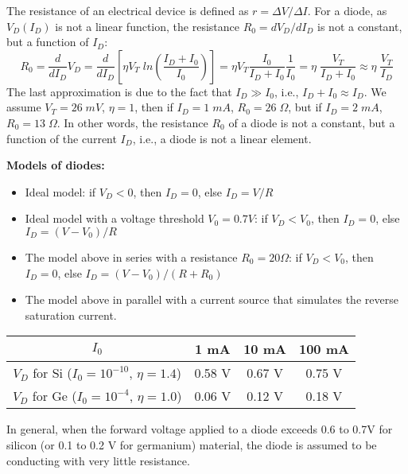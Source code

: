The resistance of an electrical device is defined as $r=\Delta V/\Delta I$.
For a diode, as $V_D(I_D)$ is not a linear function, the resistance 
$R_0=dV_D/dI_D$ is not a constant, but a function of $I_D$:
\[
 R_0=\frac{d}{dI_D}V_D=\frac{d}{dI_D} [\eta V_T\;ln (\frac{I_D+I_0}{I_0})]
=\eta V_T \frac{I_0}{I_D+I_0}\frac{1}{I_0}=\eta \; \frac{V_T}{I_D+I_0}
\approx \eta \; \frac{V_T}{I_D}	\]
The last approximation is due to the fact that $I_D \gg I_0$, i.e., 
$I_D+I_0\approx I_D$. We assume $V_T=26\;mV$, $\eta=1$, then if $I_D=1\;mA$, 
$R_0=26\;\Omega$, but if $I_D=2\;mA$, $R_0=13\;\Omega$. In other words, the 
resistance $R_0$ of a diode is not a constant, but a function of the current 
$I_D$, i.e.,  a diode is not a linear element.

{\bf Models of diodes:}


\begin{itemize}
\item Ideal model: if $V_D<0$, then $I_D=0$, else $I_D=V/R$
\item Ideal model with a voltage threshold $V_0=0.7V$:
	if $V_D<V_0$, then $I_D=0$, else $I_D=(V-V_0)/R$
\item The model above in series with a resistance $R_0=20\Omega$:
	if $V_D<V_0$, then $I_D=0$, else $I_D=(V-V_0)/(R+R_0)$
\item The model above in parallel with a current source that simulates
  the reverse saturation current.
\end{itemize}


\begin{tabular}{c||c|c|c}\\ \hline
 $I_0$	& 1 mA & 10 mA & 100 mA	\\ \hline
$V_D$ for Si ($I_0=10^{-10}$, $\eta=1.4$) & 0.58 V & 0.67 V & 0.75 V \\
$V_D$ for Ge ($I_0=10^{-4}$, $\eta=1.0$) & 0.06 V & 0.12 V & 0.18 V \\
\end{tabular}

In general, when the forward voltage applied to a diode exceeds 0.6 to 
0.7V for silicon (or 0.1 to 0.2 V for germanium) material, the diode is 
assumed to be conducting with very little resistance.

